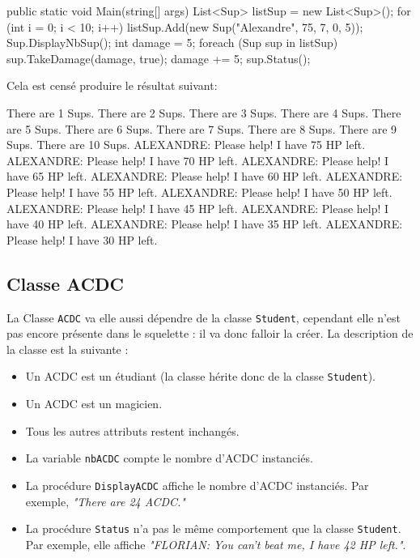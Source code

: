 \begin{code}
public static void Main(string[] args)
{
	List<Sup> listSup = new List<Sup>();
    for (int i = 0; i < 10; i++)
    {
    	listSup.Add(new Sup("Alexandre", 75, 7, 0, 5));
        Sup.DisplayNbSup();
    }
    int damage = 5; 
    foreach (Sup sup in listSup)
    {
    	sup.TakeDamage(damage, true);
    	damage += 5;
        sup.Status();
    }
}
\end{code}
\newpage
Cela est censé produire le résultat suivant:
\begin{shell}
There are 1 Sups.
There are 2 Sups.
There are 3 Sups.
There are 4 Sups.
There are 5 Sups.
There are 6 Sups.
There are 7 Sups.
There are 8 Sups.
There are 9 Sups.
There are 10 Sups.
ALEXANDRE: Please help! I have 75 HP left.
ALEXANDRE: Please help! I have 70 HP left.
ALEXANDRE: Please help! I have 65 HP left.
ALEXANDRE: Please help! I have 60 HP left.
ALEXANDRE: Please help! I have 55 HP left.
ALEXANDRE: Please help! I have 50 HP left.
ALEXANDRE: Please help! I have 45 HP left.
ALEXANDRE: Please help! I have 40 HP left.
ALEXANDRE: Please help! I have 35 HP left.
ALEXANDRE: Please help! I have 30 HP left.
\end{shell}
\subsection{Classe ACDC}
La Classe \texttt{ACDC} va elle aussi dépendre de la classe \texttt{Student}, cependant elle n'est pas encore présente dans le squelette : il va donc falloir la créer. 
La description de la classe est la suivante :
\begin{itemize}
\item Un ACDC est un étudiant (la classe hérite donc de la classe \texttt{Student}).
\item Un ACDC est un magicien.
\item Tous les autres attributs restent inchangés.
\item La variable \texttt{nbACDC} compte le nombre d'ACDC instanciés.
\item La procédure \texttt{DisplayACDC} affiche le nombre d'ACDC instanciés. Par exemple, \emph{"There are 24 ACDC."}
\item La procédure \texttt{Status} n'a pas le même comportement que la classe \texttt{Student}. Par exemple, elle affiche \textit{"FLORIAN: You can't beat me, I have 42 HP left."}.
\end{itemize}
\newpage
